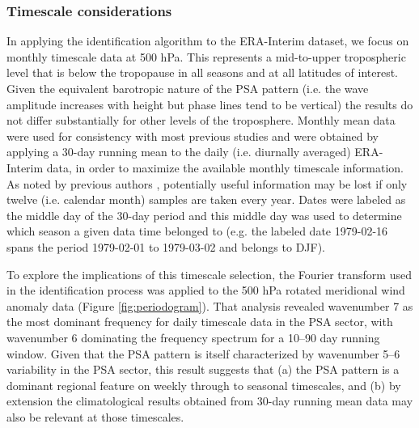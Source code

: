 \subsubsection{Timescale considerations}

In applying the identification algorithm to the ERA-Interim dataset, we focus on monthly timescale data at 500 hPa. This represents a mid-to-upper tropospheric level that is below the tropopause in all seasons and at all latitudes of interest. Given the equivalent barotropic nature of the PSA pattern (i.e. the wave amplitude increases with height but phase lines tend to be vertical) the results do not differ substantially for other levels of the troposphere. Monthly mean data were used for consistency with most previous studies and were obtained by applying a 30-day running mean to the daily (i.e. diurnally averaged) ERA-Interim data, in order to maximize the available monthly timescale information. As noted by previous authors \citep[e.g.][]{Kidson1988}, potentially useful information may be lost if only twelve (i.e. calendar month) samples are taken every year. Dates were labeled as the middle day of the 30-day period and this middle day was used to determine which season a given data time belonged to (e.g. the labeled date 1979-02-16 spans the period 1979-02-01 to 1979-03-02 and belongs to DJF). 

To explore the implications of this timescale selection, the Fourier transform used in the identification process was applied to the 500 hPa rotated meridional wind anomaly data (Figure \ref{fig:periodogram}). That analysis revealed wavenumber 7 as the most dominant frequency for daily timescale data in the PSA sector, with wavenumber 6 dominating the frequency spectrum for a 10--90 day running window. Given that the PSA pattern is itself characterized by wavenumber 5--6 variability in the PSA sector, this result suggests that (a) the PSA pattern is a dominant regional feature on weekly through to seasonal timescales, and (b) by extension the climatological results obtained from 30-day running mean data may also be relevant at those timescales.

